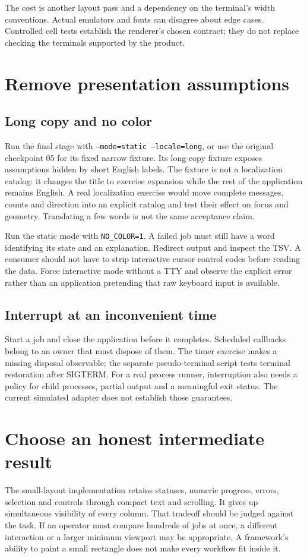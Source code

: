 The cost is another layout pass and a dependency on the terminal's width conventions. Actual emulators and fonts can disagree about edge cases. Controlled cell tests establish the renderer's chosen contract; they do not replace checking the terminals supported by the product.

\section{Remove presentation assumptions}

\subsection{Long copy and no color}

Run the final stage with \texttt{--mode=static --locale=long}, or use the original checkpoint 05 for its fixed narrow fixture. Its long-copy fixture exposes assumptions hidden by short English labels. The fixture is not a localization catalog: it changes the title to exercise expansion while the rest of the application remains English. A real localization exercise would move complete messages, counts and direction into an explicit catalog and test their effect on focus and geometry. Translating a few words is not the same acceptance claim.

Run the static mode with \texttt{NO\_COLOR=1}. A failed job must still have a word identifying its state and an explanation. Redirect output and inspect the TSV. A consumer should not have to strip interactive cursor control codes before reading the data. Force interactive mode without a TTY and observe the explicit error rather than an application pretending that raw keyboard input is available.

\subsection{Interrupt at an inconvenient time}

Start a job and close the application before it completes. Scheduled callbacks belong to an owner that must dispose of them. The timer exercise makes a missing disposal observable; the separate pseudo-terminal script tests terminal restoration after SIGTERM. For a real process runner, interruption also needs a policy for child processes, partial output and a meaningful exit status. The current simulated adapter does not establish those guarantees.

\section{Choose an honest intermediate result}

The small-layout implementation retains statuses, numeric progress, errors, selection and controls through compact text and scrolling. It gives up simultaneous visibility of every column. That tradeoff should be judged against the task. If an operator must compare hundreds of jobs at once, a different interaction or a larger minimum viewport may be appropriate. A framework's ability to paint a small rectangle does not make every workflow fit inside it.
